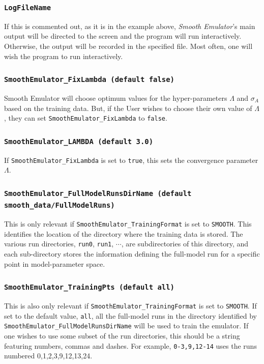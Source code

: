 \documentclass[UserManual.tex]{subfiles}
\begin{document}
\begin{sloppypar}
\subsubsection{{\tt LogFileName}}
If this is commented out, as it is in the example above, {\it Smooth Emulator}'s main output will be directed to the screen and the program will run interactively. Otherwise, the output will be recorded in the specified file. Most often, one will wish the program to run interactively.

\subsubsection{{\tt SmoothEmulator\_FixLambda (default false)}}
Smooth Emulator will choose optimum values for the hyper-parameters $\Lambda$ and $\sigma_A$ based on the training data. But, if the User wishes to choose their own value of $\Lambda$, they can set {\tt SmoothEmulator\_FixLambda} to {\tt false}.

\subsubsection{{\tt SmoothEmulator\_LAMBDA (default 3.0)}}
If {\tt SmoothEmulator\_FixLambda} is set to {\tt true}, this sets the convergence parameter $\Lambda$.

\subsubsection{{\tt SmoothEmulator\_FullModelRunsDirName (default smooth\_data/FullModelRuns)}}
This is only relevant if {\tt SmoothEmulator\_TrainingFormat} is set to {\tt SMOOTH}. This identifies the location of the directory where the training data is stored. The various run directories, {\tt run0}, {\tt run1}, $\cdots$, are subdirectories of this directory, and each sub-directory stores the information defining the full-model run for a specific point in model-parameter space.

\subsubsection{{\tt SmoothEmulator\_TrainingPts (default all)}}
This is also only relevant if {\tt SmoothEmulator\_TrainingFormat} is set to {\tt SMOOTH}. If set to the default value, {\tt all}, all the full-model runs in the directory identified by {\tt SmoothEmulator\_FullModelRunsDirName} will be used to train the emulator. If one wishes to use some subset of the run directories, this should be a string featuring numbers, commas and dashes. For example, {\tt 0-3,9,12-14} uses the runs numbered 0,1,2,3,9,12,13,24.


\end{sloppypar}
\end{document}
